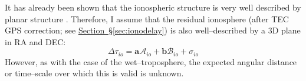 		
		
		
		It has already been shown that the ionospheric structure is very well described by planar structure \citep[][ ; Figure 5]{Rioja2018}. Therefore, I assume that the residual ionosphere (after TEC GPS correction; see \hyperref[sec:ionodelay]{Section~\S\ref*{sec:ionodelay}}) is also well--described by a 3D plane in RA and DEC:
		\begin{equation}
			\Delta\tau_{io} = \textbf{a}\mathcal{A}_{io} + \textbf{b}\mathcal{B}_{io} + \sigma_{io}
		\end{equation} 
		However, as with the case of the wet--troposphere, the expected angular distance or time--scale over which this is valid is unknown.
	

